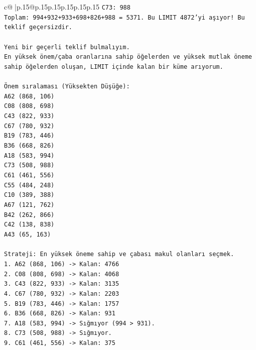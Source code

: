 \documentclass{article}
\begin{document}
{\begin{supertabular}{c@{$\;$}|p{.15\linewidth}@{}p{.15\linewidth}p{.15\linewidth}p{.15\linewidth}p{.15\linewidth}p{.15\linewidth}}
{{{\texttt{C73: 988} \\
\texttt{Toplam: 994+932+933+698+826+988 = 5371. Bu LIMIT 4872'yi aşıyor! Bu teklif geçersizdir.} \\
\\ 
\texttt{Yeni bir geçerli teklif bulmalıyım.} \\
\texttt{En yüksek önem/çaba oranlarına sahip öğelerden ve yüksek mutlak öneme sahip öğelerden oluşan, LIMIT içinde kalan bir küme arıyorum.} \\
\\ 
\texttt{Önem sıralaması (Yüksekten Düşüğe):} \\
\texttt{A62 (868, 106)} \\
\texttt{C08 (808, 698)} \\
\texttt{C43 (822, 933)} \\
\texttt{C67 (780, 932)} \\
\texttt{B19 (783, 446)} \\
\texttt{B36 (668, 826)} \\
\texttt{A18 (583, 994)} \\
\texttt{C73 (508, 988)} \\
\texttt{C61 (461, 556)} \\
\texttt{C55 (484, 248)} \\
\texttt{C10 (389, 388)} \\
\texttt{A67 (121, 762)} \\
\texttt{B42 (262, 866)} \\
\texttt{C42 (138, 838)} \\
\texttt{A43 (65, 163)} \\
\\ 
\texttt{Strateji: En yüksek öneme sahip ve çabası makul olanları seçmek.} \\
\texttt{1. A62 (868, 106) {-}> Kalan: 4766} \\
\texttt{2. C08 (808, 698) {-}> Kalan: 4068} \\
\texttt{3. C43 (822, 933) {-}> Kalan: 3135} \\
\texttt{4. C67 (780, 932) {-}> Kalan: 2203} \\
\texttt{5. B19 (783, 446) {-}> Kalan: 1757} \\
\texttt{6. B36 (668, 826) {-}> Kalan: 931} \\
\texttt{7. A18 (583, 994) {-}> Sığmıyor (994 > 931).} \\
\texttt{8. C73 (508, 988) {-}> Sığmıyor.} \\
\texttt{9. C61 (461, 556) {-}> Kalan: 375} \\
}}}
\end{supertabular}}
\end{document}
